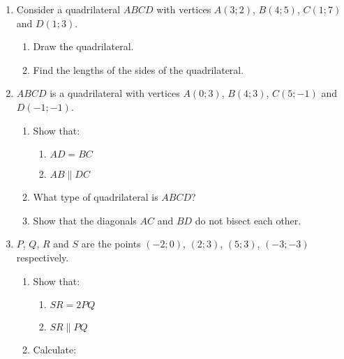 \begin{exercises}{}
{\begin{enumerate}[itemsep=5pt, label=\textbf{\arabic*}. ]
\begin{eocexercises}{}
\begin{enumerate}[noitemsep, label=\textbf{\arabic*}. ]
\begin{figure}[H]
    \end{figure}  
    \begin{enumerate}[noitemsep, label=\textbf{(\alph*)} ]
    \item Calculate the lengths of the opposite sides of $FGHI$?
    \item Are the opposite sides of $FGHI$ parallel?
    \item Do the diagonals of $FGHI$ bisect each other?
    \item Can you state what type of quadrilateral $FGHI$ is? Give reasons for your answer.
    \end{enumerate}
  \item Consider a quadrilateral $ABCD$ with vertices $A(3;2)$, $B(4;5)$, $C(1;7)$ and $D(1;3)$.
    \begin{enumerate}[noitemsep, label=\textbf{(\alph*)} ]
    \item  Draw the quadrilateral.
    \item  Find the lengths of the sides of the quadrilateral.
    \end{enumerate}
  \item $ABCD$ is a quadrilateral with vertices $A(0;3)$, $B(4;3)$, $C(5;-1)$ and $D(-1;-1)$.
    \begin{enumerate}[noitemsep, label=\textbf{(\alph*)} ]
    \item Show that:
      \begin{enumerate}[noitemsep, label=\textbf{\roman*}. ] 
      \item $AD = BC$
      \item $AB \parallel DC$
      \end{enumerate}
    \item What type of quadrilateral is $ABCD$?
    \item Show that the diagonals $AC$ and $BD$ do not bisect each other.
    \end{enumerate}
  \item $P$, $Q$, $R$ and $S$ are the points $(-2;0)$, $(2;3)$, $(5;3)$, $(-3;-3)$ respectively.
    \begin{enumerate}[noitemsep, label=\textbf{(\alph*)} ]
    \item Show that:
      \begin{enumerate}[noitemsep, label=\textbf{\roman*}. ] 
      \item $SR = 2PQ$
      \item $SR \parallel PQ$
      \end{enumerate}
    \item Calculate:

\end{enumerate}
\end{enumerate}
\end{eocexercises}
\end{enumerate}}
\end{exercises}
